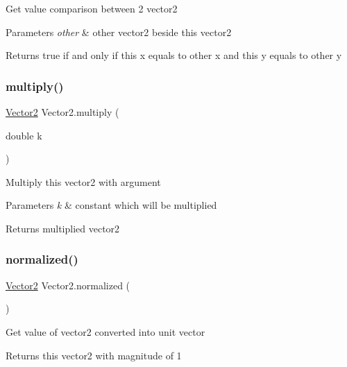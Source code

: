 Get value comparison between 2 vector2 
\begin{DoxyParams}{Parameters}
{\em other} & other vector2 beside this vector2 \\
\hline
\end{DoxyParams}
\begin{DoxyReturn}{Returns}
true if and only if this x equals to other x and this y equals to other y 
\end{DoxyReturn}
\mbox{\label{class_vector2_ac9db5aab07eb87c6b6fcfd22b0257be6}} 
\subsubsection{\texorpdfstring{multiply()}{multiply()}}
{\footnotesize\ttfamily \mbox{\hyperlink{class_vector2}{Vector2}} Vector2.\+multiply (\begin{DoxyParamCaption}\item[{double}]{k }\end{DoxyParamCaption})\hspace{0.3cm}{\ttfamily [inline]}}

Multiply this vector2 with argument 
\begin{DoxyParams}{Parameters}
{\em k} & constant which will be multiplied \\
\hline
\end{DoxyParams}
\begin{DoxyReturn}{Returns}
multiplied vector2 
\end{DoxyReturn}
\mbox{\label{class_vector2_ad26f00c8e5cfc76198b1115ce29b51ad}} 
\subsubsection{\texorpdfstring{normalized()}{normalized()}}
{\footnotesize\ttfamily \mbox{\hyperlink{class_vector2}{Vector2}} Vector2.\+normalized (\begin{DoxyParamCaption}{ }\end{DoxyParamCaption})\hspace{0.3cm}{\ttfamily [inline]}}

Get value of vector2 converted into unit vector \begin{DoxyReturn}{Returns}
this vector2 with magnitude of 1 
\end{DoxyReturn}
\mbox{\label{class_vector2_a139f45c8088a42e3971e6614aa62a8aa}} 
